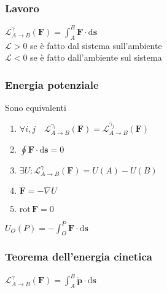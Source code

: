 \documentclass[10pt,a4paper,landscape]{article}
\newcommand{\de}{\mathrm d}
\newcommand{\rot}[1]{\text{rot}\,#1}
\begin{document}
\begin{multicols}{3}
\subsubsection{Lavoro}
$\mathscr L_{A \to B}^\gamma (\mathbf F) = \int_A^B \mathbf F \cdot \de\mathbf s$\\
$\mathscr L > 0$ se è fatto dal sistema sull'ambiente\\
$\mathscr L < 0$ se è fatto dall'ambiente sul sistema\\

\subsubsection{Energia potenziale}
Sono equivalenti \begin{enumerate}
	\item $\forall i,j \quad \mathscr L_{A \to B}^{\gamma_i} (\mathbf F) = \mathscr L_{A \to B}^{\gamma_j} (\mathbf F)$
\item $\oint \mathbf F \cdot \de\mathbf s = 0$
	\item $\exists U : \mathscr L_{A \to B}^\gamma (\mathbf F) = U(A) - U(B)$
	\item $\mathbf F = -\nabla U$
	\item $\rot\mathbf F = 0$\\
\end{enumerate}
$U_O(P) = -\int_O^P \mathbf F \cdot \de\mathbf s$

\subsubsection{Teorema dell'energia cinetica}
$\mathscr L_{A \to B}^\gamma (\mathbf F) = \int_A^B \mathbf{\dot p} \cdot \de\mathbf s$

\end{multicols}
\end{document}
